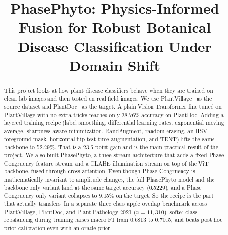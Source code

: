 \documentclass[conference]{IEEEtran}
\begin{document}
\title{PhasePhyto: Physics-Informed Fusion for Robust Botanical\\Disease Classification Under Domain Shift}

\author{
\and
{}
}

\maketitle

\begin{abstract}
This project looks at how plant disease classifiers behave when they are trained on clean lab images and then tested on real field images. We use PlantVillage~\cite{Hughes2015} as the source dataset and PlantDoc~\cite{Singh2020} as the target. A plain Vision Transformer fine tuned on PlantVillage with no extra tricks reaches only 28.76\% accuracy on PlantDoc. Adding a layered training recipe (label smoothing, differential learning rates, exponential moving average, sharpness aware minimization, RandAugment, random erasing, an HSV foreground mask, horizontal flip test time augmentation, and TENT) lifts the same backbone to 52.29\%. That is a 23.5 point gain and is the main practical result of the project. We also built PhasePhyto, a three stream architecture that adds a fixed Phase Congruency feature stream and a CLAHE illumination stream on top of the ViT backbone, fused through cross attention. Even though Phase Congruency is mathematically invariant to amplitude changes, the full PhasePhyto model and the backbone only variant land at the same target accuracy (0.5229), and a Phase Congruency only variant collapses to 9.15\% on the target. So the recipe is the part that actually transfers. In a separate three class apple overlap benchmark across PlantVillage, PlantDoc, and Plant Pathology 2021 ($n{=}11{,}310$), softer class rebalancing during training raises macro F1 from 0.6813 to 0.7015, and beats post hoc prior calibration even with an oracle prior.
\end{abstract}
\end{document}
